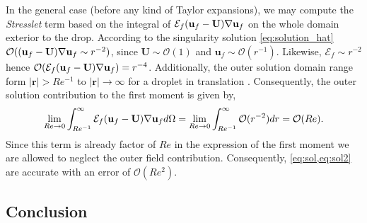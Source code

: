 In the general case (before any kind of Taylor expansions), we may compute the \textit{Stresslet} term based on the integral of $\mathcal{E}_f (\textbf{u}_f - \textbf{U})\mathbf{\nabla} \textbf{u}_f$ on the whole domain exterior to the drop. 
According to the singularity solution \eqref{eq:solution_hat} $\mathcal{O}((\textbf{u}_f - \textbf{U})\mathbf{\nabla} \textbf{u}_f \sim r^{-2})$, since $\textbf{U} \sim \mathcal{O}(1)$ and $\textbf{u}_f\sim \mathcal{O}(r^{-1})$. 
Likewise, $\mathcal{E}_f \sim r^{-2}$ hence $\mathcal{O}(\mathcal{E}_f (\textbf{u}_f - \textbf{U})\mathbf{\nabla} \textbf{u}_f) = r^{-4}$. 
Additionally, the outer solution domain range form $|\textbf{r}| > Re^{-1}$ to $|\textbf{r}|\to \infty$ for a droplet in translation \citep{proudman1957expansions}.
Consequently, the outer solution contribution to the first moment is given by\citep{stone2001inertial}, 
\begin{equation}
    \lim_{Re \to 0 }
    \int_{Re^{-1}}^\infty
    \mathcal{E}_f (\textbf{u}_f - \textbf{U})\mathbf{\nabla} \textbf{u}_f
    d\Omega
    =
    \lim_{Re \to 0 }
    \int_{Re^{-1}}^\infty
    \mathcal{O}(r^{-2})
    dr
    = \mathcal{O}(Re). 
\end{equation}
Since this term is already factor of $Re$ in the expression of the first moment we are allowed to neglect the outer field contribution. 
Consequently, \ref{eq:sol,eq:sol2} are accurate with an error of $\mathcal{O}(Re^2)$. 

\subsection{Conclusion}


